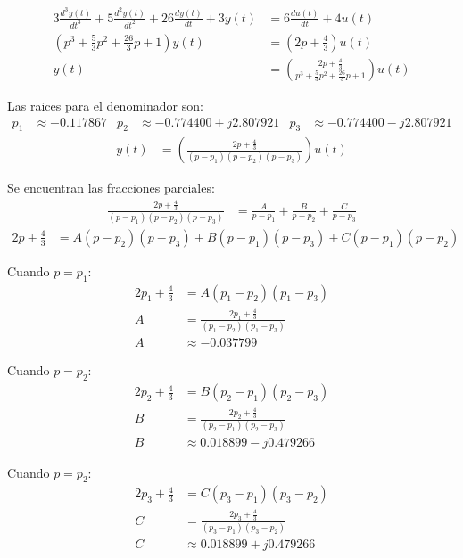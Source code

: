 \begin{align*}
  3\frac{d^3y(t)}{dt^3}
  + 5 \frac{d^2y(t)}{dt^2}
  + 26 \frac{dy(t)}{dt}
  + 3y(t)
  &= 6\frac{du(t)}{dt}
  + 4u(t)
  \\
  \left(
    p^3 + \frac{5}{3} p^2 + \frac{26}{3} p + 1
  \right) y(t)
  &= \left(
    2p + \frac{4}{3}
  \right) u(t)
  \\
  y(t) &= \left( \frac{2p + \frac{4}{3}}{p^3 + \frac{5}{3} p^2 + \frac{26}{3} p + 1} \right) u(t)
\end{align*}

Las raices para el denominador son:
\begin{align*}
  p_1 &\approx -0.117867 &
  p_2 &\approx -0.774400 + j2.807921 &
  p_3 &\approx -0.774400 - j2.807921
\end{align*}
\begin{align*}
  y(t) &= \left( \frac{2p + \frac{4}{3}}{(p-p_1)(p-p_2)(p-p_3)} \right) u(t)
\end{align*}

Se encuentran las fracciones parciales:
\begin{align*}
  \frac{2p + \frac{4}{3}}{(p-p_1)(p-p_2)(p-p_3)}
  &= \frac{A}{p-p_1} + \frac{B}{p-p_2} + \frac{C}{p-p_3}
\end{align*}
\begin{align*}
  2p + \frac{4}{3}
  &= A (p-p_2)(p-p_3)
  + B (p-p_1)(p-p_3)
  + C (p-p_1)(p-p_2)
\end{align*}

Cuando $p=p_1$:
\begin{align*}
  2p_1 + \frac{4}{3}
  &= A (p_1-p_2)(p_1-p_3)
  \\
  A &= \frac{2p_1 + \frac{4}{3}}{(p_1-p_2)(p_1-p_3)}
  \\
  A &\approx -0.037799
\end{align*}

Cuando $p=p_2$:
\begin{align*}
  2p_2 + \frac{4}{3}
  &= B (p_2-p_1)(p_2-p_3)
  \\
  B &= \frac{2p_2 + \frac{4}{3}}{(p_2-p_1)(p_2-p_3)}
  \\
  B &\approx 0.018899-j0.479266
\end{align*}

Cuando $p=p_2$:
\begin{align*}
  2p_3 + \frac{4}{3}
  &= C (p_3-p_1)(p_3-p_2)
  \\
  C &= \frac{2p_3 + \frac{4}{3}}{(p_3-p_1)(p_3-p_2)}
  \\
  C &\approx 0.018899+j0.479266
\end{align*}

